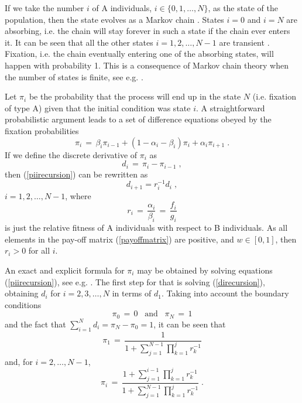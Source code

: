 \documentclass[12pt]{article}
\begin{document}
If we take the number $i$ of A individuals, $i \in \{0,1, \dots, N\}$, as the state of the population, then the state evolves as a Markov chain \cite{allen}. States $i=0$ and $i=N$ are absorbing, i.e. the chain will stay forever in such a state if the chain ever enters it. It can be seen that all the other states $i=1, 2, \dots, N-1$ are transient \cite{allen}. Fixation, i.e. the chain eventually entering one of the absorbing states, will happen with probability 1. This is a consequence of Markov chain theory when the number of states is finite, see e.g. \cite{allen}.

Let $\pi_i$ be the probability that the process will end up in the state $N$ (i.e. fixation of type A) given that the initial condition was state $i$. A straightforward probabilistic argument leads to a set of difference equations obeyed by the fixation probabilities
\begin{equation}
\label{piirecursion}
\pi_i \,=\, \beta_i \pi_{i-1} + (1- \alpha_i-\beta_i) \pi_i + \alpha_i \pi_{i+1} \;.
\end{equation}
If we define the discrete derivative of $\pi_i$ as
\begin{equation}
\label{defderivative}
d_i \,=\, \pi_i-\pi_{i-1} \;,
\end{equation}
then (\ref{piirecursion}) can be rewritten as
\begin{equation}  \label{direcursion}
 d_{i+1} = r_i^{-1} d_i \;,
\end{equation}
 $i=1,2, \dots, N-1$, where
 \begin{equation}  \label{defri}
r_i \,=\, \frac{\alpha_i}{\beta_i} \,=\,\frac{f_i}{g_i}
 \end{equation}
 is just the relative fitness of A individuals with respect to B individuals. As all elements in the pay-off matrix (\ref{payoffmatrix}) are positive, and $w \in [0,1]$, then $r_i>0$ for all $i$.
 
An exact and explicit formula for $\pi_i$ may be obtained by solving equations (\ref{piirecursion}), see e.g. \cite{nowakbook}. The first step for that is solving (\ref{direcursion}), obtaining $d_i$ for $i=2, 3, \dots, N$ in terms of $d_1$. Taking into account the boundary conditions 
 \begin{equation}
 \label{boundcond}
 \pi_0 \,=\, 0 \;\;\;\mathrm{and} \;\;\; \pi_N\,=\,1
 \end{equation}
 and the fact that $\sum_{i=1}^{N} d_i = \pi_N- \pi_{0}=1$, it can be seen that
 \begin{equation}
 \label{pi1formula}
 \pi_1 \,=\, \frac{1}{1+ \sum_{j=1}^{N-1} \prod_{k=1}^j r_k^{-1}}
 \end{equation}
 and, for $i=2, \dots, N-1$,
\begin{equation}
\label{piiformula}
\pi_i \,=\, \frac{1+ \sum_{j=1}^{i-1} \prod_{k=1}^j r_k^{-1}}{1+ \sum_{j=1}^{N-1} \prod_{k=1}^j r_k^{-1}} \;.
\end{equation}
\end{document}

